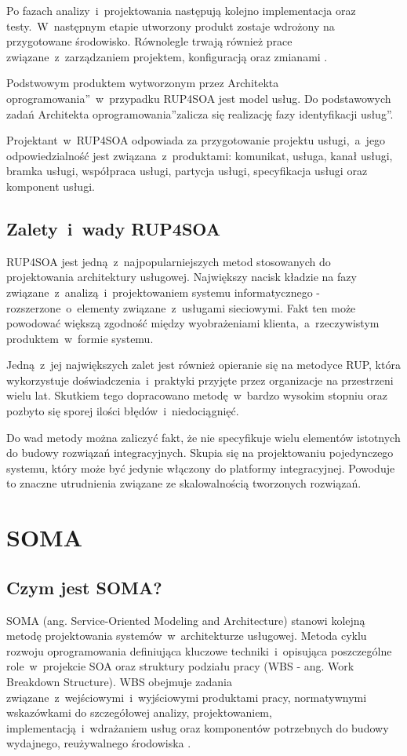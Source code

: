 Po fazach analizy~i~projektowania następują kolejno implementacja oraz testy.~W~następnym etapie utworzony produkt zostaje wdrożony na przygotowane środowisko. Równolegle trwają również prace związane~z~zarządzaniem projektem, konfiguracją oraz zmianami \cite{PlatIntGor}.

Podstwowym produktem wytworzonym przez \quotedblbase Architekta oprogramowania\textquotedblright~w~przypadku RUP4SOA jest model usług. Do podstawowych zadań \quotedblbase Architekta oprogramowania\textquotedblright zalicza się realizację fazy \quotedblbase identyfikacji usług\textquotedblright.

Projektant~w~RUP4SOA odpowiada za przygotowanie projektu usługi,~a~jego odpowiedzialność jest związana~z~produktami: komunikat, usługa, kanał usługi, bramka usługi, współpraca usługi, partycja usługi, specyfikacja usługi oraz komponent usługi. 

\subsection{Zalety~i~wady RUP4SOA}
RUP4SOA jest jedną~z~najpopularniejszych metod stosowanych do projektowania architektury usługowej. Największy nacisk kładzie na fazy związane~z~analizą~i~projektowaniem systemu informatycznego - rozszerzone~o~elementy związane~z~usługami sieciowymi. Fakt ten może powodować większą zgodność między wyobrażeniami klienta,~a~rzeczywistym produktem~w~formie systemu. 

Jedną~z~jej największych zalet jest również opieranie się na metodyce RUP, która wykorzystuje doświadczenia~i~praktyki przyjęte przez organizacje na przestrzeni wielu lat. \cite{JonSimRUPSoa} Skutkiem tego dopracowano metodę~w~bardzo wysokim stopniu oraz pozbyto się sporej ilości błędów~i~niedociągnięć.

Do wad metody można zaliczyć fakt, że nie specyfikuje wielu elementów istotnych do budowy rozwiązań integracyjnych. Skupia się na projektowaniu pojedynczego systemu, który może być jedynie włączony do platformy integracyjnej. \cite{PlatIntGor} Powoduje to znaczne utrudnienia związane ze skalowalnością tworzonych rozwiązań.

\section{SOMA}
\subsection{Czym jest SOMA?}
SOMA (ang. Service-Oriented Modeling and Architecture) stanowi kolejną metodę projektowania systemów~w~architekturze usługowej. Metoda cyklu rozwoju oprogramowania definiująca kluczowe techniki~i~opisująca poszczególne role~w~projekcie SOA oraz struktury podziału pracy (WBS - ang. Work Breakdown Structure). WBS obejmuje zadania związane~z~wejściowymi~i~wyjściowymi produktami pracy, normatywnymi wskazówkami do szczegółowej analizy, projektowaniem, implementacją~i~wdrażaniem usług oraz komponentów potrzebnych do budowy wydajnego, reużywalnego środowiska \cite{PlatIntGor}.

